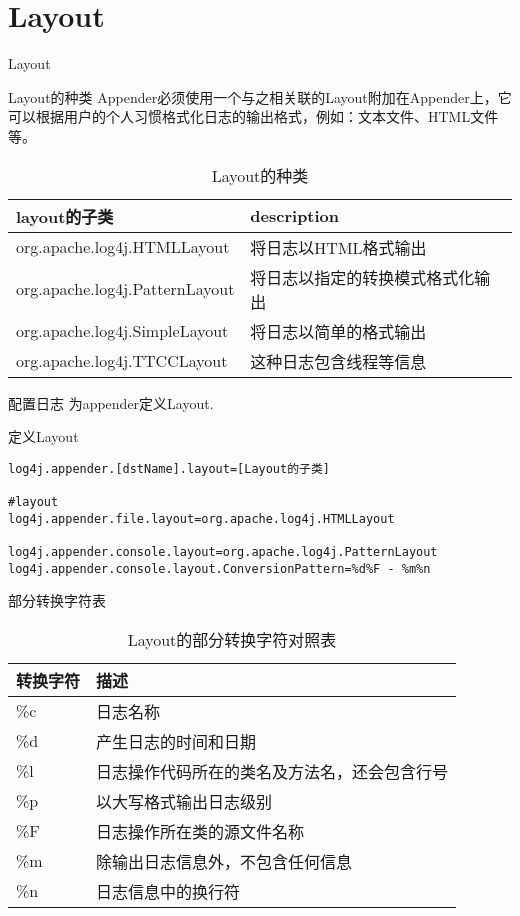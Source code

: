 \documentclass{beamer}
\begin{document}
\section{Layout}
\begin{frame}
\Huge{\centerline{Layout}}
\end{frame}
\begin{frame}{Layout的种类}
Appender必须使用一个与之相关联的Layout附加在Appender上，它可以根据用户的个人习惯格式化日志的输出格式，例如：文本文件、HTML文件等。
\begin{table}
\begin{tabular}{ll}
\toprule
\textbf{layout的子类}&\textbf{description}\\
\midrule
org.apache.log4j.HTMLLayout&将日志以HTML格式输出\\
org.apache.log4j.PatternLayout&将日志以指定的转换模式格式化输出\\
org.apache.log4j.SimpleLayout&将日志以简单的格式输出\\
org.apache.log4j.TTCCLayout&这种日志包含线程等信息\\
\bottomrule
\end{tabular}
\caption{Layout的种类}
\label{layout}
\end{table}
\end{frame}
\begin{frame}[fragile]{配置日志}
为appender定义Layout.
\begin{block}{定义Layout}
\begin{verbatim}
log4j.appender.[dstName].layout=[Layout的子类]

#layout
log4j.appender.file.layout=org.apache.log4j.HTMLLayout

log4j.appender.console.layout=org.apache.log4j.PatternLayout
log4j.appender.console.layout.ConversionPattern=%d%F - %m%n
\end{verbatim}
\end{block}
\end{frame}

\begin{frame}{部分转换字符表}
\begin{table}
\begin{tabular}{ll}
\toprule
\textbf{转换字符}&\textbf{描述}\\
\midrule
\%c&日志名称\\
\%d&产生日志的时间和日期\\
\%l&日志操作代码所在的类名及方法名，还会包含行号\\
\%p&以大写格式输出日志级别\\
\%F&日志操作所在类的源文件名称\\
\%m&除输出日志信息外，不包含任何信息\\
\%n&日志信息中的换行符\\
\bottomrule
\end{tabular}
\caption{Layout的部分转换字符对照表}
\end{table}
\end{frame}
\end{document}
